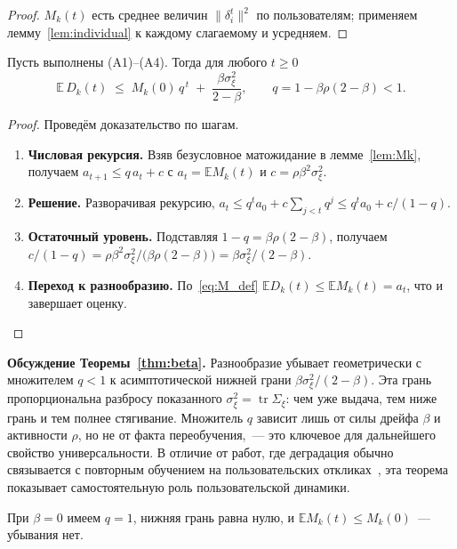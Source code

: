 \begin{proof}
$M_k(t)$ есть среднее величин $\lVert\delta_i^t\rVert^2$
по пользователям; применяем лемму~\ref{lem:individual} к каждому слагаемому и
усредняем.
\end{proof}

\begin{theorem}
\label{thm:beta}
Пусть выполнены \textup{(A1)--(A4)}. Тогда для любого $t\ge0$
\[
    \mathbb E\,D_k(t) \;\le\; M_k(0)\,q^{\,t}
    \;+\; \frac{\beta\sigma_\xi^2}{2-\beta},
    \qquad q=1-\beta\rho(2-\beta)<1.
\]
\end{theorem}

\begin{proof}
Проведём доказательство по шагам.
\begin{enumerate}
    \item \textbf{Числовая рекурсия.} Взяв безусловное матожидание в
    лемме~\ref{lem:Mk}, получаем $a_{t+1}\le q\,a_t+c$ с $a_t=\mathbb E M_k(t)$ и
    $c=\rho\beta^2\sigma_\xi^2$.
    \item \textbf{Решение.} Разворачивая рекурсию, $a_t\le q^t a_0+c\sum_{j<t}q^j
    \le q^t a_0 + c/(1-q)$.
    \item \textbf{Остаточный уровень.} Подставляя $1-q=\beta\rho(2-\beta)$,
    получаем $c/(1-q)=\rho\beta^2\sigma_\xi^2/\bigl(\beta\rho(2-\beta)\bigr)
    =\beta\sigma_\xi^2/(2-\beta)$.
    \item \textbf{Переход к разнообразию.} По~\eqref{eq:M_def}
    $\mathbb E D_k(t)\le\mathbb E M_k(t)=a_t$, что и завершает оценку.
\end{enumerate}
\end{proof}

\textbf{Обсуждение Теоремы~\ref{thm:beta}.} Разнообразие убывает геометрически с
множителем $q<1$ к асимптотической нижней грани
$\beta\sigma_\xi^2/(2-\beta)$. Эта грань пропорциональна разбросу показанного
$\sigma_\xi^2=\operatorname{tr}\Sigma_\xi$: чем уже выдача, тем ниже грань и тем
полнее стягивание. Множитель $q$ зависит лишь от силы дрейфа $\beta$ и
активности $\rho$, но не от факта переобучения,~--- это ключевое для дальнейшего
свойство универсальности. В отличие от работ, где деградация обычно связывается
с повторным обучением на пользовательских откликах~\cite{chaney2018, mansoury2020}, эта теорема
показывает самостоятельную роль пользовательской динамики.

\begin{corollary}[Отсутствие стягивания при $\beta=0$]
\label{cor:no_beta}
При $\beta=0$ имеем $q=1$, нижняя грань равна нулю, и
$\mathbb E M_k(t)\le M_k(0)$~--- убывания нет.
\end{corollary}

